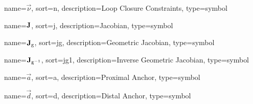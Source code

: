 	{%
		name=\ensuremath{\vec{\nu}},
		sort=n,
		description=Loop Closure Constraints,
		type=symbol
	}
	\newcommand{\loopclosureconstraints}{\gls{sym:loopclosureconstraints}}

	{%
		name=\ensuremath{\mat{J}},
		sort=j,
		description=Jacobian,
		type=symbol
	}
	\newcommand{\jac}{\gls{sym:jac}}

	{%
		name=\ensuremath{\mat{J}_{\func{g}}},
		sort=jg,
		description=Geometric Jacobian,
		type=symbol
	}
	\newcommand{\geometricjac}{\gls{sym:geometricjac}}

	{%
		name=\ensuremath{\mat{J}_{\func{g}^{-1}}},
		sort=jg1,
		description=Inverse Geometric Jacobian,
		type=symbol
	}
	\newcommand{\invgeometricjac}{\gls{sym:invgeometricjac}}

	{%
		name=\ensuremath{\vec{a}},
		sort=a,
		description=Proximal Anchor,
		type=symbol
	}
	\newcommand{\proximalanchor}{\gls{sym:proximalanchor}}

	{%
		name=\ensuremath{\vec{d}},
		sort=d,
		description=Distal Anchor,
		type=symbol
	}
	\newcommand{\distalanchor}{\gls{sym:distalanchor}}

